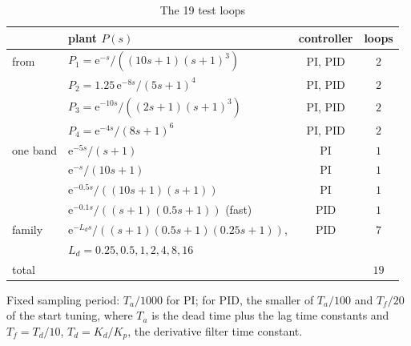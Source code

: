 \documentclass[letterpaper, 10 pt, conference]{ieeeconf}
\begin{document}
\begin{table}[t]
\centering
\caption{The 19 test loops}
\label{tab:loops}
\footnotesize\setlength{\tabcolsep}{3pt}
\begin{tabular}{@{}llcc@{}}
\toprule
& plant $P(s)$ & controller & loops\\
\midrule
from~\cite{SPIN} & $P_1=\mathrm{e}^{-s}/((10s+1)(s+1)^3)$ & PI, PID & $2$\\
& $P_2=1.25\,\mathrm{e}^{-8s}/(5s+1)^4$ & PI, PID & $2$\\
& $P_3=\mathrm{e}^{-10s}/((2s+1)(s+1)^3)$ & PI, PID & $2$\\
& $P_4=\mathrm{e}^{-4s}/(8s+1)^6$ & PI, PID & $2$\\
\midrule
one band & $\mathrm{e}^{-5s}/(s+1)$ & PI & $1$\\
& $\mathrm{e}^{-s}/(10s+1)$ & PI & $1$\\
& $\mathrm{e}^{-0.5s}/((10s+1)(s+1))$ & PI & $1$\\
& $\mathrm{e}^{-0.1s}/((s+1)(0.5s+1))$ (fast) & PID & $1$\\
\midrule
family & $\mathrm{e}^{-L_ds}/((s+1)(0.5s+1)(0.25s+1))$, & PID & $7$\\
& $L_d=0.25,0.5,1,2,4,8,16$ & & \\
\midrule
total & & & $19$\\
\bottomrule
\end{tabular}

\smallskip
\parbox{\columnwidth}{\footnotesize Fixed sampling period: $T_a/1000$ for
PI; for PID, the smaller of $T_a/100$ and $T_f/20$ of the start tuning,
where $T_a$ is the dead time plus the lag time constants and
$T_f=T_d/10$, $T_d=K_d/K_p$, the derivative filter time constant.}
\end{table}
\end{document}
